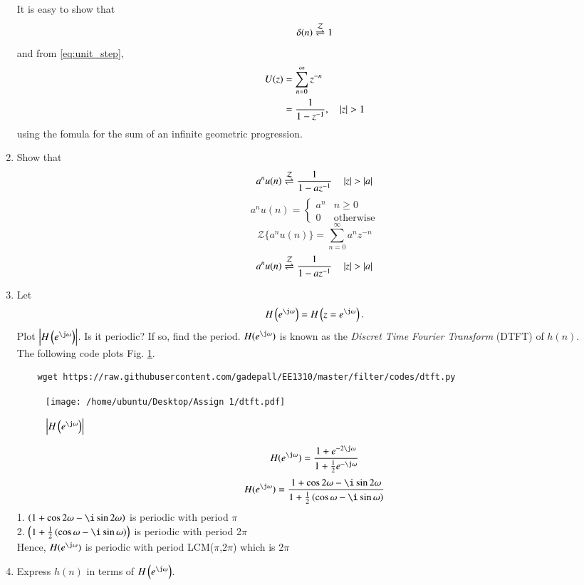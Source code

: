 \documentclass[journal,12pt,twocolumn]{IEEEtran}
\renewcommand\thesection{\arabic{section}}
\begin{document}
\begin{enumerate}[label=\thesection.\arabic*]
\solution It is easy to show that
\begin{equation}
	\delta(n) \overset{\mathcal{Z}}{ \rightleftharpoons} 1
\end{equation}
and from \eqref{eq:unit_step},
\begin{align}
	U(z) &= \sum _{n= 0}^{\infty}z^{-n}
	\\
	&=\frac{1}{1-z^{-1}}, \quad \left\vert z\right\vert > 1
\end{align}
using the fomula for the sum of an infinite geometric progression.
%
\item Show that 
\begin{equation}
	\label{eq:anun}
	a^nu(n) \overset{\mathcal{Z}}{ \rightleftharpoons} \frac{1}{1-az^{-1}} \quad \left\vert z\right\vert > \left\vert a\right\vert
\end{equation}
\solution
\begin{equation}
	\label{eq:unit_step}
	a^{n}u(n)
	=
	\begin{cases}
		a^{n} & n \ge 0
		\\
		0 & \text{otherwise}
	\end{cases}
\end{equation}
\begin{equation}
	{\mathcal{Z}}\{a^{n}u(n)\} = \sum_{n=0}^{\infty}a^{n}z^{-n}
\end{equation}
\begin{equation}
	a^{n}u(n) \overset{\mathcal{Z}}{ \rightleftharpoons} \frac{1}{1-az^{-1}} \quad \left\vert z\right\vert > \left\vert a\right\vert
\end{equation}
%
\item 
Let
\begin{equation}
	H\brak{e^{\j \omega}} = H\brak{z = e^{\j \omega}}.
\end{equation}
Plot $\abs{H\brak{e^{\j \omega}}}$.  Is it periodic? If so, find the period. $H(e^{\j \omega})$ is
known as the {\em Discret Time Fourier Transform} (DTFT) of $h(n)$.
\\
\solution The following code plots Fig. \ref{fig:dtft}.
\begin{lstlisting}
	wget https://raw.githubusercontent.com/gadepall/EE1310/master/filter/codes/dtft.py
\end{lstlisting}
\begin{figure}[!ht]
	\centering
	\texttt{[image: /home/ubuntu/Desktop/Assign 1/dtft.pdf]}
	\caption{$\abs{H\brak{e^{\j\omega}}}$}
	\label{fig:dtft}
\end{figure}
\solution
\begin{equation}
	H(e^{\j\omega}) = \frac{1 + e^{-2\j\omega}}{1 + \frac{1}{2}e^{-\j\omega}}
\end{equation}
\begin{equation}
	H(e^{\j\omega}) = \frac{1 + \cos2\omega - \i\sin2\omega}{1 + \frac{1}{2}\brak{\cos\omega - \i\sin\omega}}
\end{equation}
1. $\brak{1 + \cos2\omega - \i\sin2\omega}$ is periodic with period $\pi$ \\
2. $\brak{1 + \frac{1}{2}\brak{\cos\omega - \i\sin\omega}}$ is periodic with period 2$\pi$ \\
Hence, $H(e^{\j\omega})$ is periodic with period LCM($\pi$,2$\pi$) which is 2$\pi$
\item Express $h(n)$ in terms of $H\brak{e^{\j \omega}}$.
\end{enumerate}
\end{document}
